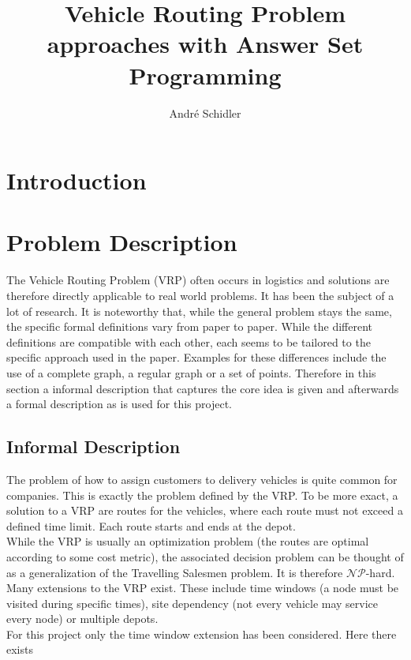\documentclass[12pt, letterpaper]{article}
\title{Vehicle Routing Problem approaches with Answer Set Programming}
\author{André Schidler}
\begin{document}
\maketitle

\section{Introduction}

\section{Problem Description}
The Vehicle Routing Problem (VRP) often occurs in logistics and solutions are therefore directly applicable to real world problems. It has been the subject of a lot of research.
It is noteworthy that, while the general problem stays the same, the specific formal definitions vary from paper to paper. While the different definitions are compatible with each other, each seems to be tailored to the specific approach used in the paper. Examples for these differences include the use of a complete graph, a regular graph or a set of points.
Therefore in this section a informal description that captures the core idea is given and afterwards a formal description as is used for this project.

\subsection{Informal Description}
The problem of how to assign customers to delivery vehicles is quite common for companies. This is exactly the problem defined by the VRP. To be more exact, a solution to a VRP are routes for the vehicles, where each route must not exceed a defined time limit. Each route starts and ends at the depot.\\
While the VRP is usually an optimization problem (the routes are optimal according to some cost metric), the associated decision problem can be thought of as a generalization of the Travelling Salesmen problem. It is therefore $\mathcal{NP}$-hard.\\

Many extensions to the VRP exist. These include time windows (a node must be visited during specific times), site dependency (not every vehicle may service every node) or multiple depots.\\
For this project only the time window extension has been considered. Here there exists \\
\end{document}
